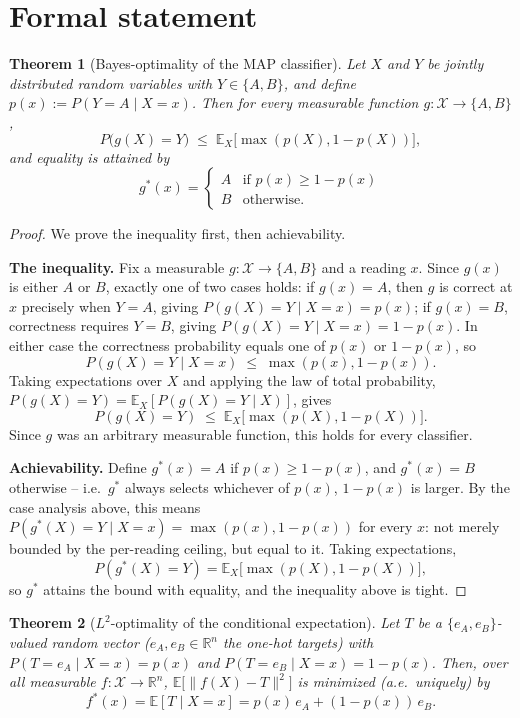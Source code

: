 \documentclass[11pt]{article}
\newtheorem{theorem}{Theorem}
\begin{document}
\section{Formal statement}

\begin{theorem}[Bayes-optimality of the MAP classifier]
Let $X$ and $Y$ be jointly distributed random variables with $Y\in\{A,B\}$,
and define $p(x) := P(Y=A\mid X=x)$. Then for every measurable function
$g:\mathcal X \to \{A,B\}$,
\[
  P\big(g(X)=Y\big) \;\le\; \mathbb{E}_X\big[\max(p(X), 1-p(X))\big],
\]
and equality is attained by
\[
  g^\ast(x) = \begin{cases} A & \text{if } p(x) \ge 1-p(x) \\ B & \text{otherwise.} \end{cases}
\]
\end{theorem}

\begin{proof}
We prove the inequality first, then achievability.

\textbf{The inequality.} Fix a measurable $g:\mathcal X\to\{A,B\}$ and a
reading $x$. Since $g(x)$ is either $A$ or $B$, exactly one of two cases
holds: if $g(x)=A$, then $g$ is correct at $x$ precisely when $Y=A$, giving
$P(g(X)=Y\mid X=x)=p(x)$; if $g(x)=B$, correctness requires $Y=B$, giving
$P(g(X)=Y\mid X=x)=1-p(x)$. In either case the correctness probability
equals one of $p(x)$ or $1-p(x)$, so
\[
  P(g(X)=Y\mid X=x) \;\le\; \max(p(x), 1-p(x)).
\]
Taking expectations over $X$ and applying the law of total probability,
$P(g(X)=Y) = \mathbb{E}_X[P(g(X)=Y\mid X)]$, gives
\[
  P(g(X)=Y) \;\le\; \mathbb{E}_X\big[\max(p(X), 1-p(X))\big].
\]
Since $g$ was an arbitrary measurable function, this holds for every
classifier.

\textbf{Achievability.} Define $g^\ast(x) = A$ if $p(x)\ge 1-p(x)$, and
$g^\ast(x)=B$ otherwise -- i.e.\ $g^\ast$ always selects whichever of
$p(x)$, $1-p(x)$ is larger. By the case analysis above, this means
$P(g^\ast(X)=Y\mid X=x) = \max(p(x),1-p(x))$ for every $x$: not merely
bounded by the per-reading ceiling, but equal to it. Taking expectations,
\[
  P(g^\ast(X)=Y) = \mathbb{E}_X\big[\max(p(X), 1-p(X))\big],
\]
so $g^\ast$ attains the bound with equality, and the inequality above is
tight.
\end{proof}

\begin{theorem}[$L^2$-optimality of the conditional expectation]
Let $T$ be a $\{e_A, e_B\}$-valued random vector ($e_A, e_B \in
\mathbb{R}^n$ the one-hot targets) with $P(T=e_A\mid X=x) = p(x)$ and
$P(T=e_B\mid X=x) = 1-p(x)$. Then, over all measurable $f:\mathcal X \to
\mathbb{R}^n$, $\mathbb{E}\big[\|f(X)-T\|^2\big]$ is minimized (a.e.\
uniquely) by
\[
  f^\ast(x) = \mathbb{E}[T\mid X=x] = p(x)\,e_A + (1-p(x))\,e_B.
\]
\end{theorem}
\end{document}
